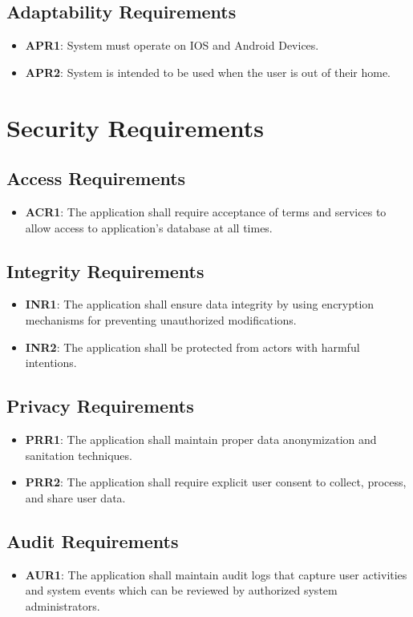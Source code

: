 \documentclass[12pt]{article}
\begin{document}
\subsection{Adaptability Requirements}
\begin{itemize}
  \item \textbf{APR1}: System must operate on IOS and Android Devices.
  \item \textbf{APR2}: System is intended to be used when the user is out of their home. 
\end{itemize}

\section{Security Requirements}
\subsection{Access Requirements}
\begin{itemize}
    \item \textbf{ACR1}: The application shall require acceptance of terms and services to allow access to application's database at all times. 
\end{itemize}
\subsection{Integrity Requirements}
\begin{itemize}
    \item \textbf{INR1}: The application shall ensure data integrity by using encryption mechanisms for preventing unauthorized modifications.
    \item \textbf{INR2}: The application shall be protected from actors with harmful intentions.
\end{itemize}
\subsection{Privacy Requirements}
\begin{itemize}
    \item \textbf{PRR1}: The application shall maintain  proper data anonymization and sanitation techniques.
    \item \textbf{PRR2}: The application shall require explicit user consent to collect, process, and share user data.
\end{itemize}
\subsection{Audit Requirements}
\begin{itemize}
    \item \textbf{AUR1}: The application shall maintain audit logs that capture user activities and system events which can be reviewed by authorized system administrators.
\end{itemize}
\end{document}
